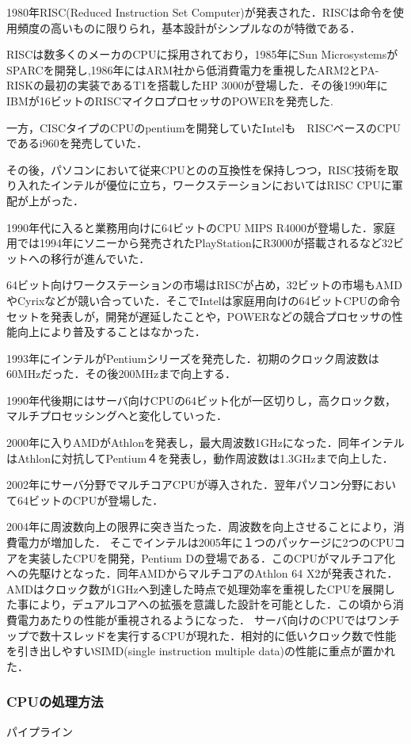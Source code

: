 \documentclass[a4j,12pt]{jsarticle}
\begin{document}
1980年RISC(Reduced Instruction Set Computer)が発表された．RISCは命令を使用頻度の高いものに限りられ，基本設計がシンプルなのが特徴である．

RISCは数多くのメーカのCPUに採用されており，1985年にSun MicrosystemsがSPARCを開発し,1986年にはARM社から低消費電力を重視したARM2とPA-RISKの最初の実装であるT1を搭載したHP 3000が登場した．その後1990年にIBMが16ビットのRISCマイクロプロセッサのPOWERを発売した.

一方，CISCタイプのCPUのpentiumを開発していたIntelも　RISCベースのCPUであるi960を発売していた．

その後，パソコンにおいて従来CPUとのの互換性を保持しつつ，RISC技術を取り入れたインテルが優位に立ち，ワークステーションにおいてはRISC CPUに軍配が上がった．

1990年代に入ると業務用向けに64ビットのCPU MIPS R4000が登場した．家庭用では1994年にソニーから発売されたPlayStationにR3000が搭載されるなど32ビットへの移行が進んでいた．

64ビット向けワークステーションの市場はRISCが占め，32ビットの市場もAMDやCyrixなどが競い合っていた．そこでIntelは家庭用向けの64ビットCPUの命令セットを発表しが，開発が遅延したことや，POWERなどの競合プロセッサの性能向上により普及することはなかった．

1993年にインテルがPentiumシリーズを発売した．初期のクロック周波数は60MHzだった．その後200MHzまで向上する．

1990年代後期にはサーバ向けCPUの64ビット化が一区切りし，高クロック数，マルチプロセッシングへと変化していった．

2000年に入りAMDがAthlonを発表し，最大周波数1GHzになった．同年インテルはAthlonに対抗してPentium４を発表し，動作周波数は1.3GHzまで向上した．

2002年にサーバ分野でマルチコアCPUが導入された．翌年パソコン分野において64ビットのCPUが登場した．

2004年に周波数向上の限界に突き当たった．周波数を向上させることにより，消費電力が増加した．
そこでインテルは2005年に１つのパッケージに2つのCPUコアを実装したCPUを開発，Pentium Dの登場である．このCPUがマルチコア化への先駆けとなった．同年AMDからマルチコアのAthlon 64 X2が発表された．AMDはクロック数が1GHzへ到達した時点で処理効率を重視したCPUを展開した事により，デュアルコアへの拡張を意識した設計を可能とした．この頃から消費電力あたりの性能が重視されるようになった．
サーバ向けのCPUではワンチップで数十スレッドを実行するCPUが現れた．相対的に低いクロック数で性能を引き出しやすいSIMD(single instruction multiple data)の性能に重点が置かれた．

\subsubsection{CPUの処理方法}
\begin{Large}
パイプライン
\end {Large}
\end{document}
